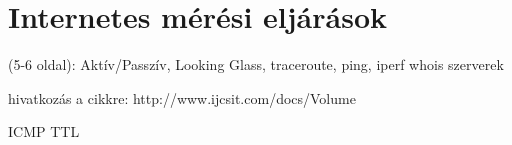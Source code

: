 
\section{Internetes mérési eljárások}
(5-6 oldal): Aktív/Passzív, Looking Glass, traceroute, ping, iperf
whois szerverek
 
 
hivatkozás a cikkre: http://www.ijcsit.com/docs/Volume%

ICMP TTL

